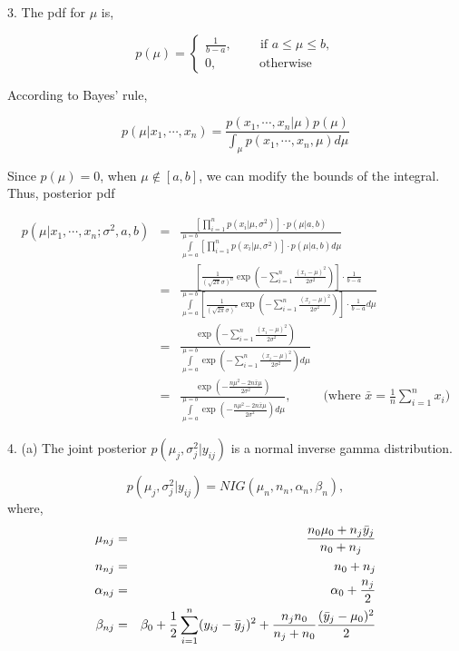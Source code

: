 \documentclass[11pt]{article}
\begin{document}
\par 3. The pdf for $\mu$ is,

\begin{equation*}
p(\mu) = 
\begin{cases}
  \frac{1}{b-a}, \; \; \; \; \; \; \; \; \mbox{if $a \le \mu \le b$}, \\
  0, \; \; \; \; \; \; \; \; \; \; \; \; \mbox{otherwise}
\end{cases}
\end{equation*}

According to Bayes' rule,

\begin{equation*}
  p(\mu | x_1, \cdots, x_n) = \frac{p(x_1, \cdots, x_n | \mu)p(\mu)}{\int_{\mu} p(x_1, \cdots, x_n, \mu) d\mu}
\end{equation*}

Since $p(\mu) = 0$, when $ \mu \notin [a,b]$, we can modify the bounds of the integral. Thus, posterior pdf 

\begin{eqnarray*}
  p(\mu | x_1, \cdots, x_n; \sigma^2,a,b) &=& \frac{ \left [ \prod\limits_{i=1}^n p(x_i|\mu,\sigma^2) \right] \cdot p(\mu|a,b) } {\int\limits_{\mu=a}^{\mu=b} \left [ \prod\limits_{i=1}^{n} p(x_i|\mu,\sigma^2)\right] \cdot p(\mu|a,b) d\mu } \\
  &=& \frac{ \left[ \frac{1}{(\sqrt{2\pi} \sigma)^n} \exp(-\sum\limits_{i=1}^{n} \frac{(x_i-\mu)^2}{2\sigma^2}) \right] \cdot \frac{1}{b-a} }{ \int\limits_{\mu=a}^{\mu=b}\left[ \frac{1}{(\sqrt{2\pi} \sigma)^n}  \exp(-\sum\limits_{i=1}^{n} \frac{(x_i-\mu)^2}{2\sigma^2}) \right] \cdot \frac{1}{b-a} d\mu} \\
&=& \frac{ \exp(-\sum\limits_{i=1}^{n} \frac{(x_i-\mu)^2}{2\sigma^2}) }{\int\limits_{\mu=a}^{\mu=b} \exp(-\sum\limits_{i=1}^{n} \frac{(x_i-\mu)^2}{2\sigma^2}) d\mu} \\
&=& \frac{\exp(-\frac{n\mu^2-2n\bar{x}\mu}{2\sigma^2} )}{\int\limits_{\mu=a}^{\mu=b} \exp(-\frac{n\mu^2-2n\bar{x}\mu}{2\sigma^2} ) d\mu}, \; \; \; \; \; \; \; \; \;\mbox{(where $\bar{x} = \frac{1}{n} \sum\limits_{i=1}^{n} x_i $)} 
\end{eqnarray*}

\par 4. (a) The joint posterior $p(\mu_j, \sigma^{2}_{j} | y_{ij})$ is a normal inverse gamma distribution.

\begin{equation*}
	p(\mu_j, \sigma^{2}_{j} | y_{ij})  = NIG(\mu_{n}, n_{n}, \alpha_{n}, \beta_{n}),
\end{equation*}
where,
\begin{eqnarray}
  \mu_{nj} &=& \frac{n_0 \mu_0 + n_j \bar{y}_j }{ n_0 + n_j} \notag \\
  n_{nj} &=& n_0 + n_j \notag \\
  \alpha_{nj}  &=& \alpha_0 + \frac{n_{j}}{2} \label{eq4a} \\
  \beta_{nj} &=& \beta_0 + \frac{1}{2} \sum\limits_{i=1}^{n} (y_{ij} - \bar{y}_{j})^2 + \frac{n_j n_0}{n_j + n_0} \frac{(\bar{y}_{j} - \mu_0)^2}{2} \notag
\end{eqnarray}
\end{document}
